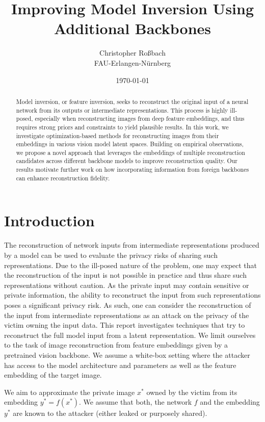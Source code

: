 \documentclass[10pt,twocolumn]{article}
\title{Improving Model Inversion Using Additional Backbones}
\author{Christopher Roßbach \\ FAU-Erlangen-Nürnberg}
\date{\today}
\begin{document}
\maketitle
\begin{abstract}
    Model inversion, or feature inversion, seeks to reconstruct the original input of a neural network from its outputs or intermediate representations.
    This process is highly ill-posed, especially when reconstructing images from deep feature embeddings, and thus requires strong priors and constraints to yield plausible results.
    In this work, we investigate optimization-based methods for reconstructing images from their embeddings in various vision model latent spaces.
    Building on empirical observations, we propose a novel approach that leverages the embeddings of multiple reconstruction candidates across different backbone models to improve reconstruction quality.
    Our results motivate further work on how incorporating information from foreign backbones can enhance reconstruction fidelity.
\end{abstract}

\section{Introduction}
The reconstruction of network inputs from intermediate representations produced by a model can be used to evaluate the privacy risks of sharing such representations.
Due to the ill-posed nature of the problem, one may expect that the reconstruction of the input is not possible in practice and thus share such representations without caution.
As the private input may contain sensitive or private information, the ability to reconstruct the input from such representations poses a significant privacy risk.
As such, one can consider the reconstruction of the input from intermediate representations as an attack on the privacy of the victim owning the input data.
This report investigates techniques that try to reconstruct the full model input from a latent representation.
We limit ourselves to the task of image reconstruction from feature embeddings given by a pretrained vision backbone.
We assume a white-box setting where the attacker has access to the model architecture and parameters as well as the feature embedding of the target image.

We aim to approximate the private image $x^*$ owned by the victim from its embedding $y^* = f(x^*)$.
We assume that both, the network $f$ and the embedding $y^*$ are known to the attacker (either leaked or purposely shared).
\end{document}
